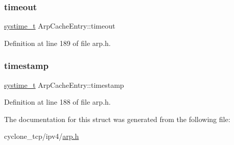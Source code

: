 \subsubsection{\texorpdfstring{timeout}{timeout}}
{\footnotesize\ttfamily \hyperlink{compiler__port_8h_ae3e32a98d431a02106616da3071832dd}{systime\+\_\+t} Arp\+Cache\+Entry\+::timeout}



Definition at line 189 of file arp.\+h.

\mbox{\label{structArpCacheEntry_a10d340cfb6df76db9d3b154bdee2758c}} 
\subsubsection{\texorpdfstring{timestamp}{timestamp}}
{\footnotesize\ttfamily \hyperlink{compiler__port_8h_ae3e32a98d431a02106616da3071832dd}{systime\+\_\+t} Arp\+Cache\+Entry\+::timestamp}



Definition at line 188 of file arp.\+h.



The documentation for this struct was generated from the following file\+:\begin{DoxyCompactItemize}
\item 
cyclone\+\_\+tcp/ipv4/\hyperlink{arp_8h}{arp.\+h}\end{DoxyCompactItemize}
